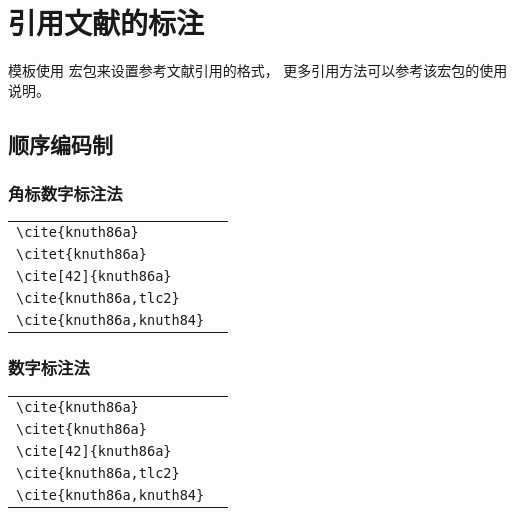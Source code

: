 
\chapter{引用文献的标注}

模板使用  宏包来设置参考文献引用的格式，
更多引用方法可以参考该宏包的使用说明。



\section{顺序编码制}

\subsection{角标数字标注法}

\noindent
\begin{tabular}{l@{\quad$\Rightarrow$\quad}l}
  \verb|\cite{knuth86a}| & \cite{knuth86a}         \\
  \verb|\citet{knuth86a}| & \citet{knuth86a}        \\
  \verb|\cite[42]{knuth86a}| & \cite[42]{knuth86a}     \\
  \verb|\cite{knuth86a,tlc2}| & \cite{knuth86a,tlc2}    \\
  \verb|\cite{knuth86a,knuth84}| & \cite{knuth86a,knuth84} \\
\end{tabular}


\subsection{数字标注法}

\noindent
\begin{tabular}{l@{\quad$\Rightarrow$\quad}l}
  \verb|\cite{knuth86a}|  & \cite{knuth86a}         \\
  \verb|\citet{knuth86a}|  & \citet{knuth86a}        \\
  \verb|\cite[42]{knuth86a}|  & \cite[42]{knuth86a}     \\
  \verb|\cite{knuth86a,tlc2}|  & \cite{knuth86a,tlc2}    \\
  \verb|\cite{knuth86a,knuth84}| & \cite{knuth86a,knuth84} \\
\end{tabular}



